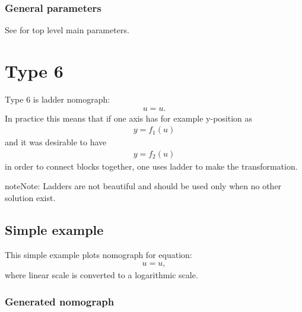\documentclass[a4paper,11pt,english]{sphinxmanual}
\let\sphinxpxdimen\pdfpxdimen\else\newdimen\sphinxpxdimen
\begin{document}
\subsubsection{General parameters}
\label{\detokenize{types/types:id23}}
See {\hyperref[\detokenize{main_params:main-params}]{}} for top level main parameters.


\section{Type 6}
\label{\detokenize{types/types:type-6}}\label{\detokenize{types/types:type6-ref}}
Type 6 is ladder nomograph:
\begin{equation*}
\begin{split}u = u.\end{split}
\end{equation*}
In practice this means that if one axis has for example y-position as
\begin{equation*}
\begin{split}y = f_1(u)\end{split}
\end{equation*}
and it was desirable to have
\begin{equation*}
\begin{split}y = f_2(u)\end{split}
\end{equation*}
in order to connect blocks together, one uses ladder to make the transformation.

\begin{sphinxadmonition}{note}{Note:}
Ladders are not beautiful and should be used only when no other solution exist.
\end{sphinxadmonition}


\subsection{Simple example}
\label{\detokenize{types/types:id24}}
This simple example plots nomograph for equation:
\begin{equation*}
\begin{split}u = u,\end{split}
\end{equation*}
where linear scale is converted to a logarithmic scale.


\subsubsection{Generated nomograph}
\label{\detokenize{types/types:id25}}
\noindent\sphinxincludegraphics[height=600\sphinxpxdimen]{{ex_type6_nomo_1}.pdf}
\end{document}
